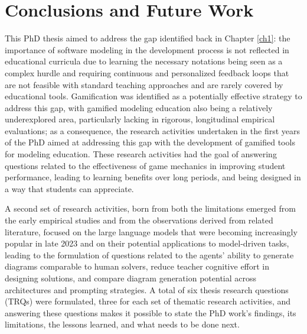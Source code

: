 \chapter{Conclusions and Future Work}
\label{ch7}

\graphicspath{{Chapter8/}}

This PhD thesis aimed to address the gap identified back in Chapter \ref{ch1}: the importance of software modeling in the development process is not reflected in educational curricula due to learning the necessary notations being seen as a complex hurdle and requiring continuous and personalized feedback loops that are not feasible with standard teaching approaches and are rarely covered by educational tools. Gamification was identified as a potentially effective strategy to address this gap, with gamified modeling education also being a relatively underexplored area, particularly lacking in rigorous, longitudinal empirical evaluations; as a consequence, the research activities undertaken in the first years of the PhD aimed at addressing this gap with the development of gamified tools for modeling education. These research activities had the goal of answering questions related to the effectiveness of game mechanics in improving student performance, leading to learning benefits over long periods, and being designed in a way that students can appreciate.

A second set of research activities, born from both the limitations emerged from the early empirical studies and from the observations derived from related literature, focused on the large language models that were becoming increasingly popular in late 2023 and on their potential applications to model-driven tasks, leading to the formulation of questions related to the agents' ability to generate diagrams comparable to human solvers, reduce teacher cognitive effort in designing solutions, and compare diagram generation potential across architectures and prompting strategies. A total of six thesis research questions (TRQs) were formulated, three for each set of thematic research activities, and answering these questions makes it possible to state the PhD work's findings, its limitations, the lessons learned, and what needs to be done next.

